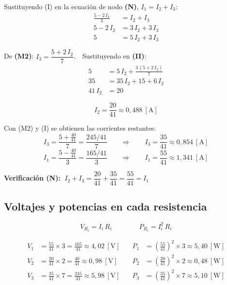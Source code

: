 \documentclass[12pt,letterpaper]{article}
\begin{document}
Sustituyendo (I) en la ecuaci\'on de nodo \textbf{(N)}, $I_1 = I_2 + I_3$:
\begin{align*}
    \frac{5 - 2\,I_2}{3} &= I_2 + I_3 \\[4pt]
    5 - 2\,I_2 &= 3\,I_2 + 3\,I_3 \\[4pt]
    5 &= 5\,I_2 + 3\,I_3 \tag{II}
\end{align*}

De \textbf{(M2)}: $I_3 = \dfrac{5 + 2\,I_2}{7}$.\ \ Sustituyendo en \textbf{(II)}:
\begin{align*}
    5 &= 5\,I_2 + \frac{3\,(5 + 2\,I_2)}{7} \\[4pt]
    35 &= 35\,I_2 + 15 + 6\,I_2 \\[4pt]
    41\,I_2 &= 20
\end{align*}

\[
    \boxed{I_2 = \frac{20}{41} \approx 0{,}488\ [\text{A}]}
\]

Con (M2) y (I) se obtienen las corrientes restantes:
\[
    I_3 = \frac{5 + \tfrac{40}{41}}{7} = \frac{245/41}{7}
    \qquad\Rightarrow\qquad
    \boxed{I_3 = \frac{35}{41} \approx 0{,}854\ [\text{A}]}
\]
\[
    I_1 = \frac{5 - \tfrac{40}{41}}{3} = \frac{165/41}{3}
    \qquad\Rightarrow\qquad
    \boxed{I_1 = \frac{55}{41} \approx 1{,}341\ [\text{A}]}
\]

\noindent\textbf{Verificaci\'on (N):}
$\;I_2 + I_3 = \dfrac{20}{41} + \dfrac{35}{41} = \dfrac{55}{41} = I_1$ \checkmark

\subsection*{Voltajes y potencias en cada resistencia}

\[
    V_{R_i} = I_i\,R_i \qquad\qquad P_{R_i} = I_i^2\,R_i
\]

\begin{align*}
    V_1 &= \frac{55}{41}\times 3 = \frac{165}{41} \approx 4{,}02\ [\text{V}]
    &\quad
    P_1 &= \left(\frac{55}{41}\right)^{\!2}\times 3 \approx 5{,}40\ [\text{W}]\\[6pt]
    V_2 &= \frac{20}{41}\times 2 = \frac{40}{41} \approx 0{,}98\ [\text{V}]
    &\quad
    P_2 &= \left(\frac{20}{41}\right)^{\!2}\times 2 \approx 0{,}48\ [\text{W}]\\[6pt]
    V_3 &= \frac{35}{41}\times 7 = \frac{245}{41} \approx 5{,}98\ [\text{V}]
    &\quad
    P_3 &= \left(\frac{35}{41}\right)^{\!2}\times 7 \approx 5{,}10\ [\text{W}]
\end{align*}
\end{document}
